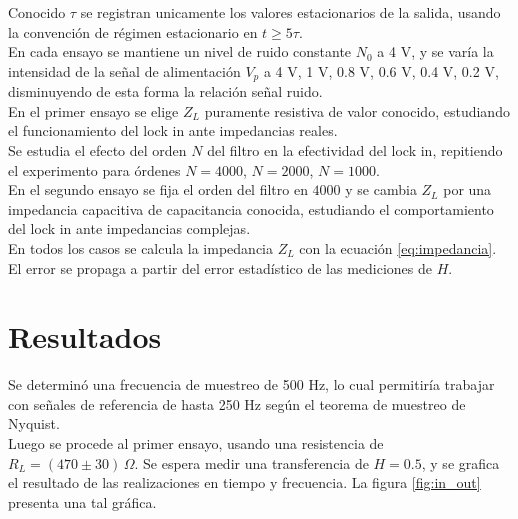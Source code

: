 \documentclass[11pt,a4paper]{extarticle}
\begin{document}
\begin{multicols}{2}
Conocido $\tau$ se registran unicamente los valores estacionarios de la salida, usando la convención de régimen estacionario en $t \ge 5\tau$.\\

En cada ensayo se mantiene un nivel de ruido constante $N_0$ a 4 V, y se varía la intensidad de la señal de alimentación $V_p$ a 4 V, 1 V, 0.8 V, 0.6 V, 0.4 V, 0.2 V, disminuyendo de esta forma la relación señal ruido.\\


En el primer ensayo se elige $Z_L$ puramente resistiva de valor conocido, estudiando el funcionamiento del lock in ante impedancias reales.\\ 

Se estudia el efecto del orden $N$ del filtro en la efectividad del lock in, repitiendo el experimento para órdenes $N=4000$, $N=2000$, $N=1000$.\\

En el segundo ensayo se fija el orden del filtro en $4000$ y se cambia $Z_L$ por una impedancia capacitiva de capacitancia conocida, estudiando el comportamiento del lock in ante impedancias complejas.\\

En todos los casos se calcula la impedancia $Z_L$ con la ecuación \ref{eq:impedancia}. El error se propaga a partir del error estadístico de las mediciones de $H$.

\section{Resultados}

Se determinó una frecuencia de muestreo de 500 Hz, lo cual permitiría trabajar con señales de referencia de hasta 250 Hz 
según el teorema de muestreo de Nyquist.\\

Luego se procede al primer ensayo, usando una resistencia de $R_L = (470 \pm 30)\,\Omega$.
Se espera medir una transferencia de $H = 0.5$, y se grafica el resultado de las realizaciones en tiempo y frecuencia. La figura \ref{fig:in_out} presenta una tal gráfica.\\


\end{multicols}
\end{document}
